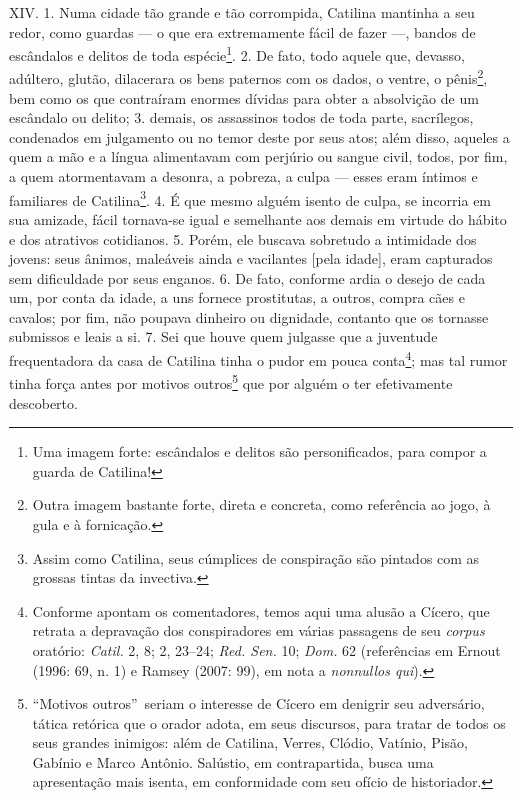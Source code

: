 XIV. 1. Numa cidade tão grande e tão corrompida, Catilina mantinha a seu redor,
como guardas --- o que era extremamente fácil de fazer ---, bandos de
escândalos e delitos de toda espécie\footnote{Uma imagem forte: escândalos e
delitos são personificados, para compor a guarda de Catilina!}. 2. De fato,
todo aquele que, devasso, adúltero, glutão, dilacerara os bens paternos com os
dados, o ventre, o pênis\footnote{Outra imagem bastante forte, direta e
concreta, como referência ao jogo, à gula e à fornicação.}, bem como os que contraíram enormes dívidas para obter a absolvição
de um escândalo ou delito; 3. demais, os assassinos todos de toda parte,
sacrílegos, condenados em julgamento ou no temor deste por seus atos; além
disso, aqueles a quem a mão e a língua alimentavam com perjúrio ou sangue
civil, todos, por fim, a quem atormentavam a desonra, a pobreza, a culpa ---
esses eram íntimos e familiares de Catilina\footnote{Assim como Catilina, seus
cúmplices de conspiração são pintados com as grossas tintas da invectiva.}. 4.
É que mesmo alguém isento de culpa, se incorria em sua amizade, fácil
tornava-se igual e semelhante aos demais em virtude do hábito e dos atrativos
cotidianos. 5. Porém, ele buscava sobretudo a intimidade dos jovens: seus
ânimos, maleáveis ainda e vacilantes [pela idade], eram capturados sem
dificuldade por seus enganos. 6. De fato, conforme ardia o desejo de cada um, 
por conta da idade, a uns fornece prostitutas, a outros, compra cães e cavalos; por
fim, não poupava dinheiro ou dignidade, contanto que os tornasse submissos e
leais a si. 7. Sei que houve quem julgasse que a juventude frequentadora da
casa de Catilina tinha o pudor em pouca conta\footnote{Conforme apontam os
comentadores, temos aqui uma alusão a Cícero, que retrata a depravação dos
conspiradores em várias passagens de seu \emph{corpus} oratório:
\emph{Catil.} 2, 8; 2, 23--24; \emph{Red. Sen.} 10; \emph{Dom.} 62 (referências em Ernout
(1996: 69, n. 1) e Ramsey (2007: 99), em nota a \emph{nonnullos qui}).};
mas tal rumor tinha força antes por motivos outros\footnote{``Motivos outros''\
seriam o interesse de Cícero em denigrir seu adversário, tática retórica que o
orador adota, em seus discursos, para tratar de todos os seus grandes inimigos:
além de Catilina, Verres, Clódio, Vatínio, Pisão, Gabínio e Marco Antônio. Salústio, em contrapartida, busca uma apresentação mais isenta, em conformidade com seu ofício de historiador.} que por
alguém o ter efetivamente descoberto.

